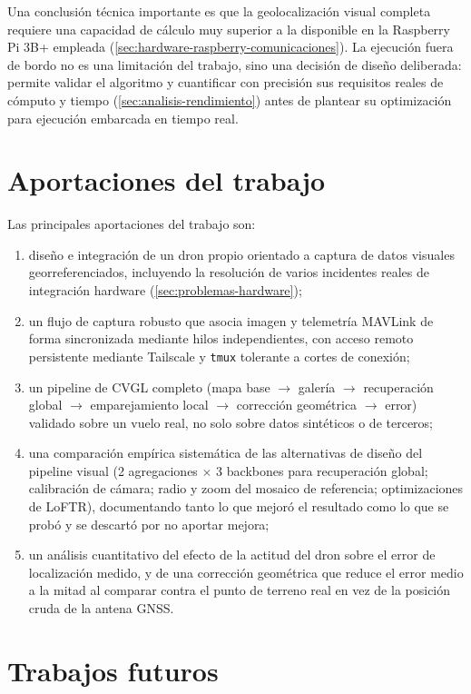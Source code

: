 Una conclusión técnica importante es que la geolocalización visual completa requiere una capacidad de cálculo muy superior a la disponible en la Raspberry Pi 3B+ empleada (\autoref{sec:hardware-raspberry-comunicaciones}). La ejecución fuera de bordo no es una limitación del trabajo, sino una decisión de diseño deliberada: permite validar el algoritmo y cuantificar con precisión sus requisitos reales de cómputo y tiempo (\autoref{sec:analisis-rendimiento}) antes de plantear su optimización para ejecución embarcada en tiempo real.

\section{Aportaciones del trabajo}
\label{sec:aportaciones}

Las principales aportaciones del trabajo son:

\begin{enumerate}
\item diseño e integración de un dron propio orientado a captura de datos visuales georreferenciados, incluyendo la resolución de varios incidentes reales de integración hardware (\autoref{sec:problemas-hardware});
\item un flujo de captura robusto que asocia imagen y telemetría MAVLink de forma sincronizada mediante hilos independientes, con acceso remoto persistente mediante Tailscale y \texttt{tmux} tolerante a cortes de conexión;
\item un pipeline de CVGL completo (mapa base $\rightarrow$ galería $\rightarrow$ recuperación global $\rightarrow$ emparejamiento local $\rightarrow$ corrección geométrica $\rightarrow$ error) validado sobre un vuelo real, no solo sobre datos sintéticos o de terceros;
\item una comparación empírica sistemática de las alternativas de diseño del pipeline visual (2 agregaciones $\times$ 3 backbones para recuperación global; calibración de cámara; radio y zoom del mosaico de referencia; optimizaciones de LoFTR), documentando tanto lo que mejoró el resultado como lo que se probó y se descartó por no aportar mejora;
\item un análisis cuantitativo del efecto de la actitud del dron sobre el error de localización medido, y de una corrección geométrica que reduce el error medio a la mitad al comparar contra el punto de terreno real en vez de la posición cruda de la antena GNSS.
\end{enumerate}

\section{Trabajos futuros}
\label{sec:trabajos-futuros}

